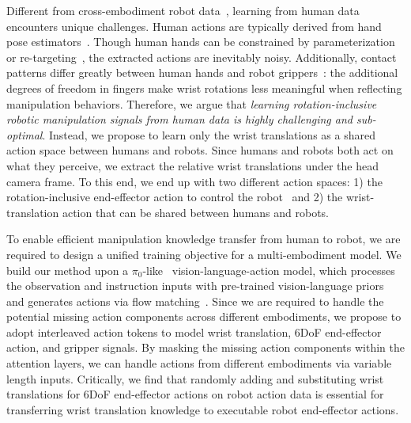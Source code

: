 Different from cross-embodiment robot data~\cite{o2024open,wu2024robomind,hou2025robomind,wu2025robocoin}, learning from human data encounters unique challenges. 
% 
Human actions are typically derived from hand pose estimators~\cite{kareer2025emergence,cheang2025gr3,kareer2025egomimic,yang2025egovla}.
% 
Though human hands can be constrained by parameterization~\cite{luo2025being,luo2026being,pavlakos2024reconstructing,romero2022embodied,yang2025egovla} or re-targeting~\cite{zheng2026egoscale}, the extracted actions are inevitably noisy.
% 
Additionally, contact patterns differ greatly between human hands and robot grippers~\cite{wei2026one}: the additional degrees of freedom in fingers make wrist rotations less meaningful when reflecting manipulation behaviors.
% 
Therefore, we argue that \emph{learning rotation-inclusive robotic manipulation signals from human data is highly challenging and sub-optimal}.
% 
Instead, we propose to learn only the wrist translations as a shared action space between humans and robots.
% 
Since humans and robots both act on what they perceive, we extract the relative wrist translations under the head camera frame.
% 
To this end, we end up with two different action spaces: 1) the rotation-inclusive end-effector action to control the robot~\cite{zheng2026egoscale,cheang2025gr3,kareer2025emergence} and 2) the wrist-translation action that can be shared between humans and robots.



To enable efficient manipulation knowledge transfer from human to robot, we are required to design a unified training objective for a multi-embodiment model.
% 
We build our method upon a $\pi_0$-like~\cite{black2024pi_0} vision-language-action model, which processes the observation and instruction inputs with pre-trained vision-language priors and generates actions via flow matching~\cite{liu2022flow,lipman2022flow}.
% 
Since we are required to handle the potential missing action components across different embodiments, we propose to adopt interleaved action tokens to model wrist translation, 6DoF end-effector action, and gripper signals.
% 
By masking the missing action components within the attention layers, we can handle actions from different embodiments via variable length inputs.
% 
Critically, we find that randomly adding and substituting wrist translations for 6DoF end-effector actions on robot action data is essential for transferring wrist translation knowledge to executable robot end-effector actions.



